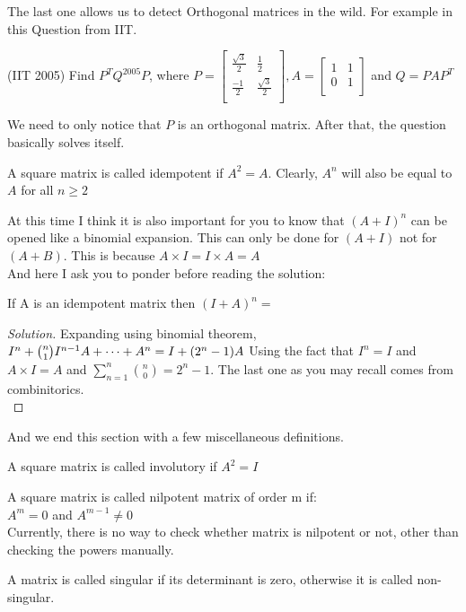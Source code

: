 The last one allows us to detect Orthogonal matrices in the wild. For example in this Question from IIT.\\
\begin{example}
    (IIT 2005) Find $P^TQ^{2005}P$, where $P=\begin{bmatrix}
        \frac{\sqrt{3}}{2} & \frac{1}{2} \\
        \frac{-1}{2} & \frac{\sqrt{3}}{2}\\
    \end{bmatrix}, A= \begin{bmatrix}
        1 & 1\\
        0 & 1\\
    \end{bmatrix}$ and $Q=PAP^T$
\end{example}
We need to only notice that $P$ is an orthogonal matrix. After that, the question basically solves itself.\\
\begin{definition}
    A square matrix is called idempotent if $A^2= A$. Clearly, $A^n$ will also be equal to $A$ for all $n \geq 2$
\end{definition}
At this time I think it is also important for you to know that $(A+I)^n$ can be opened like a binomial expansion. This can only be done for $(A+I)$ not for $(A+B)$. This is because $A \times I = I \times A = A$\\
And here I ask you to ponder before reading the solution:\\
\begin{example}
If A is an idempotent matrix then $(I+A)^n=$
\end{example}
\begin{proof}
    [Solution]
    Expanding using binomial theorem, $I^n+\binom{n}{1}I^{n-1}A+\dots + A^n\\
    = I+(2^n-1)A$
    Using the fact that $I^n=I$ and $A \times I=A$ and $\sum^n_{n=1}\binom{n}{0}=2^n-1$. The last one as you may recall comes from combinitorics.\\
\end{proof}
And we end this section with a few miscellaneous definitions.
\begin{definition}
    A square matrix is called involutory if $A^2= I$
\end{definition}
\begin{definition}
    A square matrix is called nilpotent matrix of order
m if:\\
$A^m=0$ and $A^{m-1} \neq 0$\\
Currently, there is no way to check whether matrix is nilpotent or not, other than checking the powers manually.
\end{definition}
\begin{definition}
    A matrix is called singular if its determinant is zero, otherwise it is called non-singular.\\
\end{definition}
